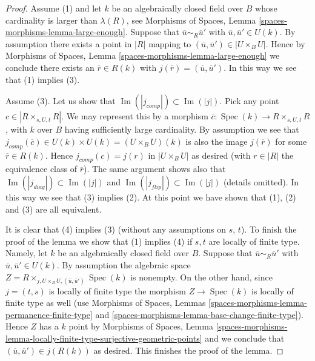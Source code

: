 \documentclass[10pt,a4paper]{amsart}
\theoremstyle{plain}
\theoremstyle{definition}
\theoremstyle{remark}
\numberwithin{equation}{subsection}
\def\Spec{\mathop{\mathrm{Spec}}}
\def\Im{\mathop{\mathrm{Im}}}
\begin{document}
\begin{proof}
\medskip\noindent
Assume (1) and let $k$ be an algebraically closed field over $B$ whose
cardinality is larger than $\lambda(R)$, see
Morphisms of Spaces, Lemma \ref{spaces-morphisms-lemma-large-enough}.
Suppose that $\overline{u} \sim_R \overline{u}'$ with
$\overline{u}, \overline{u}' \in U(k)$. By assumption there exists
a point in $|R|$ mapping to $(\overline{u}, \overline{u}') \in |U \times_B U|$.
Hence by
Morphisms of Spaces, Lemma \ref{spaces-morphisms-lemma-large-enough}
we conclude there exists an $\overline{r} \in R(k)$ with
$j(\overline{r}) = (\overline{u}, \overline{u}')$. In this way we see
that (1) implies (3).

\medskip\noindent
Assume (3). Let us show that
$\Im(|j_{comp}|) \subset \Im(|j|)$. Pick any point
$c \in |R \times_{s, U, t} R|$. We may represent this by a morphism
$\overline{c} : \Spec(k) \to R \times_{s, U, t} R$, with $k$ over $B$
having sufficiently large cardinality. By assumption we see that
$j_{comp}(\overline{c}) \in U(k) \times U(k) = (U \times_B U)(k)$
is also the image $j(\overline{r})$ for some $\overline{r} \in R(k)$.
Hence $j_{comp}(c) = j(r)$ in $|U \times_B U|$ as desired (with
$r \in |R|$ the equivalence class of $\overline{r}$). The same argument
shows also that $\Im(|j_{diag}|) \subset \Im(|j|)$ and
$\Im(|j_{flip}|) \subset \Im(|j|)$ (details omitted).
In this way we see that (3) implies (2). At this point we have
shown that (1), (2) and (3) are all equivalent.

\medskip\noindent
It is clear that (4) implies (3) (without any assumptions on $s$, $t$).
To finish the proof of the lemma we show that (1) implies (4) if $s, t$
are locally of finite type. Namely, let $k$ be an algebraically closed
field over $B$. Suppose that $\overline{u} \sim_R \overline{u}'$ with
$\overline{u}, \overline{u}' \in U(k)$. By assumption the algebraic space
$Z = R \times_{j, U \times_B U, (\overline{u}, \overline{u}')} \Spec(k)$
is nonempty. On the other hand, since $j = (t, s)$ is locally of finite type
the morphism $Z \to \Spec(k)$ is locally of finite type as well (use
Morphisms of Spaces, Lemmas \ref{spaces-morphisms-lemma-permanence-finite-type}
and \ref{spaces-morphisms-lemma-base-change-finite-type}).
Hence $Z$ has a $k$ point by
Morphisms of Spaces, Lemma
\ref{spaces-morphisms-lemma-locally-finite-type-surjective-geometric-points}
and we conclude that $(\overline{u}, \overline{u}') \in j(R(k))$
as desired. This finishes the proof of the lemma.
\end{proof}
\end{document}
